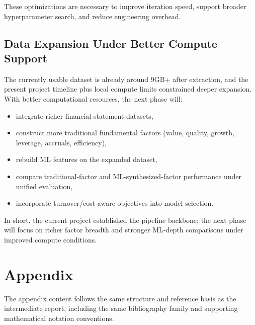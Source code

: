 \documentclass[letterpaper,11pt]{article}
\begin{document}
These optimizations are necessary to improve iteration speed, support broader hyperparameter search, and reduce engineering overhead.

\subsection{Data Expansion Under Better Compute Support}
The currently usable dataset is already around 9GB+ after extraction, and the present project timeline plus local compute limits constrained deeper expansion. With better computational resources, the next phase will:
\begin{itemize}
    \item integrate richer financial statement datasets,
    \item construct more traditional fundamental factors (value, quality, growth, leverage, accruals, efficiency),
    \item rebuild ML features on the expanded dataset,
    \item compare traditional-factor and ML-synthesized-factor performance under unified evaluation,
    \item incorporate turnover/cost-aware objectives into model selection.
\end{itemize}

In short, the current project established the pipeline backbone; the next phase will focus on richer factor breadth and stronger ML-depth comparisons under improved compute conditions.

\section*{Appendix}
The appendix content follows the same structure and reference basis as the intermediate report, including the same bibliography family and supporting mathematical notation conventions.
\end{document}
